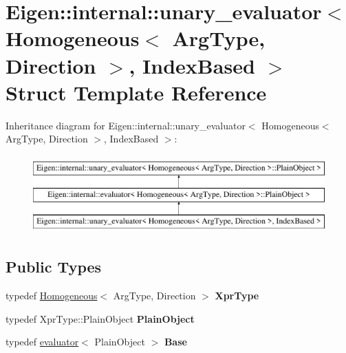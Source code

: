 \hypertarget{struct_eigen_1_1internal_1_1unary__evaluator_3_01_homogeneous_3_01_arg_type_00_01_direction_01_4_00_01_index_based_01_4}{}\section{Eigen\+::internal\+::unary\+\_\+evaluator$<$ Homogeneous$<$ Arg\+Type, Direction $>$, Index\+Based $>$ Struct Template Reference}
\label{struct_eigen_1_1internal_1_1unary__evaluator_3_01_homogeneous_3_01_arg_type_00_01_direction_01_4_00_01_index_based_01_4}
Inheritance diagram for Eigen\+::internal\+::unary\+\_\+evaluator$<$ Homogeneous$<$ Arg\+Type, Direction $>$, Index\+Based $>$\+:\begin{figure}[H]
\begin{center}
\leavevmode
\includegraphics[height=3.000000cm]{struct_eigen_1_1internal_1_1unary__evaluator_3_01_homogeneous_3_01_arg_type_00_01_direction_01_4_00_01_index_based_01_4}
\end{center}
\end{figure}
\subsection*{Public Types}
\begin{DoxyCompactItemize}
\item 
\mbox{\label{struct_eigen_1_1internal_1_1unary__evaluator_3_01_homogeneous_3_01_arg_type_00_01_direction_01_4_00_01_index_based_01_4_acc3657619eab84f5ec3328767286288f}} 
typedef \mbox{\hyperlink{class_eigen_1_1_homogeneous}{Homogeneous}}$<$ Arg\+Type, Direction $>$ {\bfseries Xpr\+Type}
\item 
\mbox{\label{struct_eigen_1_1internal_1_1unary__evaluator_3_01_homogeneous_3_01_arg_type_00_01_direction_01_4_00_01_index_based_01_4_aacccd7d2deaaded32ff5221deafd10a3}} 
typedef Xpr\+Type\+::\+Plain\+Object {\bfseries Plain\+Object}
\item 
\mbox{\label{struct_eigen_1_1internal_1_1unary__evaluator_3_01_homogeneous_3_01_arg_type_00_01_direction_01_4_00_01_index_based_01_4_a008cab07c8fa1c15d77baff726dd0a82}} 
typedef \mbox{\hyperlink{struct_eigen_1_1internal_1_1evaluator}{evaluator}}$<$ Plain\+Object $>$ {\bfseries Base}
\end{DoxyCompactItemize}
